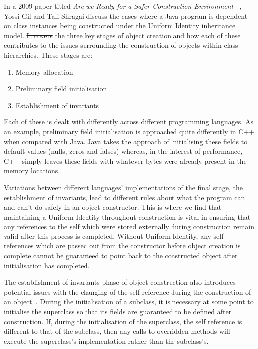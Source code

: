 \documentclass[11pt
              , a4paper
              , twoside
              , openright
              ]{report}
\providecommand{\DIFadd}[1]{{\protect\color{blue}\uwave{#1}}} %
\providecommand{\DIFdel}[1]{{\protect\color{red}\sout{#1}}}                      %
\providecommand{\DIFaddbegin}{} %
\providecommand{\DIFaddend}{} %
\providecommand{\DIFdelbegin}{} %
\providecommand{\DIFdelend}{} %
\begin{document}
\DIFdelend \DIFaddbegin \label{inheritanceModels}
\DIFaddend In a 2009 paper titled \textit{Are we Ready for a Safer Construction Environment ~\cite{SaferConstruction}}, Yossi Gil and Tali Shragai discuss the cases where a Java program is dependent on class instances being constructed under the Uniform Identity inheritance model. \DIFdelbegin \DIFdel{It covers }\DIFdelend \DIFaddbegin \DIFadd{Gil and Shragai then cover }\DIFaddend the three key stages of object creation and how each of these contributes to the issues surrounding the construction of objects within class hierarchies. These stages are:
\begin{enumerate}
	\item Memory allocation
	\item Preliminary field initialisation
	\item Establishment of invariants
\end{enumerate}
Each of these is dealt with differently across different programming languages. As an example, preliminary field initialisation is approached quite differently in C++ when compared with Java. Java takes the approach of initialising these fields to default values (nulls, zeros and falses) whereas, in the interest of performance, C++ simply leaves these fields with whatever bytes were already present in the memory locations.

Variations between different languages’ implementations of the final stage, the establishment of invariants, lead to different rules about what the program can and can't do safely in an object constructor. This is where we find that maintaining a Uniform Identity throughout construction is vital in ensuring that any references to the self which were stored externally during construction remain valid after this process is completed. Without Uniform Identity, any self references which are passed out from the constructor before object creation is complete cannot be guaranteed to point back to the constructed object after initialisation has completed.
\newline

The establishment of invariants phase of object construction also introduces potential issues with the changing of the self reference during the construction of an object~\cite{SaferConstruction}. During the initialisation of a subclass, it is necessary at some point to initialise the superclass so that its fields are guaranteed to be defined after construction. If, during the initialisation of the superclass, the self reference is different to that of the subclass, then any calls to overridden methods will execute the superclass's implementation rather than the subclass's.
\end{document}
